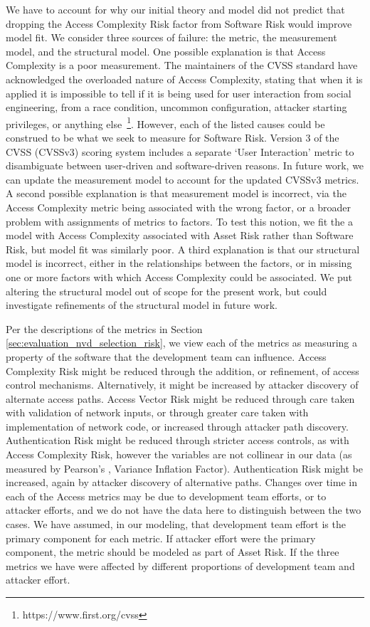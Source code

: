 We have to account for why our initial theory and model did not predict that dropping the Access Complexity Risk factor from Software Risk would improve model fit. We consider three sources of failure: the metric, the measurement model, and the structural model.  One possible explanation is that Access Complexity is a poor measurement. The maintainers of the CVSS standard have acknowledged the overloaded nature of Access Complexity, stating that when it is applied it is impossible to tell if it is being used for user interaction from social engineering, from a race condition, uncommon configuration, attacker starting privileges, or anything else~\footnote{https://www.first.org/cvss}. However, each of the listed causes could be construed to be what we seek to measure for Software Risk. Version 3 of the CVSS (CVSSv3) scoring system includes a separate `User Interaction' metric to disambiguate between user-driven and software-driven reasons. In future work, we can update the measurement model to account for the updated CVSSv3 metrics. A second possible explanation is that measurement model is incorrect, via the Access Complexity metric being associated with the wrong factor, or a broader problem with assignments of metrics to factors. To test this notion, we fit the a model with Access Complexity associated with Asset Risk rather than Software Risk, but model fit was similarly poor. A third explanation is that our structural model is incorrect, either in the relationships between the factors, or in missing one or more factors with which Access Complexity could be associated. We put altering the structural model out of scope for the present work, but could investigate refinements of the structural model in future work. 

Per the descriptions of the metrics in Section \ref{sec:evaluation_nvd_selection_risk}, we view each of the metrics as measuring a property of the software that the development team can influence. Access Complexity Risk might be reduced through the addition, or refinement, of access control mechanisms. Alternatively, it might be increased by attacker discovery of alternate access paths.   Access Vector Risk might be reduced through care taken with validation of network inputs, or through greater care taken with implementation of network code, or increased through attacker path discovery. Authentication Risk might be reduced through stricter access controls, as with Access Complexity Risk, however the variables are not collinear in our data (as measured by Pearson's , Variance Inflation Factor). Authentication Risk might be increased, again by attacker discovery of alternative paths. Changes over time in each of the Access metrics may be due to development team efforts, or to attacker efforts, and we do not have the data here to distinguish between the two cases. We have assumed, in our modeling, that development team effort is the primary component for each metric. If attacker effort were the primary component, the metric should be modeled as part of Asset Risk.  If the three metrics we have were affected by different proportions of development team and attacker effort.

